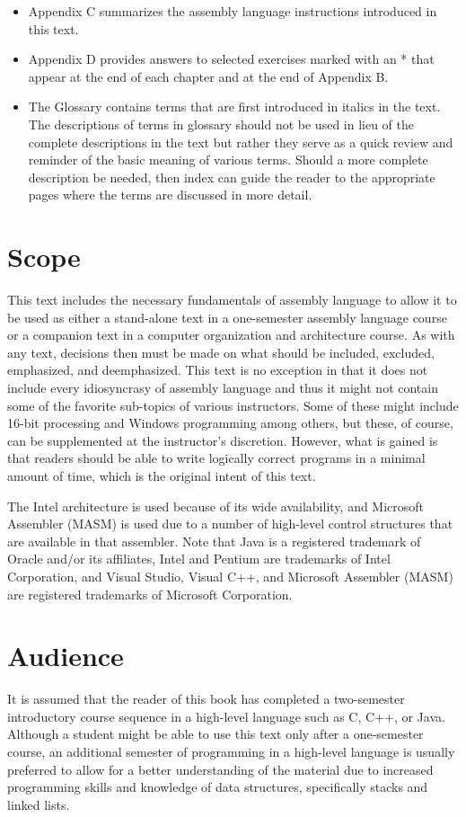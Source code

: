 \documentclass[10pt]{article}
\begin{document}
\begin{itemize}
  \item Appendix C summarizes the assembly language instructions introduced in this text.
  \item Appendix D provides answers to selected exercises marked with an * that appear at the end of each chapter and at the end of Appendix B.
  \item The Glossary contains terms that are first introduced in italics in the text. The descriptions of terms in glossary should not be used in lieu of the complete descriptions in the text but rather they serve as a quick review and reminder of the basic meaning of various terms. Should a more complete description be needed, then index can guide the reader to the appropriate pages where the terms are discussed in more detail.
\end{itemize}

\section*{Scope}
This text includes the necessary fundamentals of assembly language to allow it to be used as either a stand-alone text in a one-semester assembly language course or a companion text in a computer organization and architecture course. As with any text, decisions then must be made on what should be included, excluded, emphasized, and deemphasized. This text is no exception in that it does not include every idiosyncrasy of assembly language and thus it might not contain some of the favorite sub-topics of various instructors. Some of these might include 16-bit processing and Windows programming among others, but these, of course, can be supplemented at the instructor's discretion. However, what is gained is that readers should be able to write logically correct programs in a minimal amount of time, which is the original intent of this text.

The Intel architecture is used because of its wide availability, and Microsoft Assembler (MASM) is used due to a number of high-level control structures that are available in that assembler. Note that Java is a registered trademark of Oracle and/or its affiliates, Intel and Pentium are trademarks of Intel Corporation, and Visual Studio, Visual C++, and Microsoft Assembler (MASM) are registered trademarks of Microsoft Corporation.

\section*{Audience}
It is assumed that the reader of this book has completed a two-semester introductory course sequence in a high-level language such as C, C++, or Java. Although a student might be able to use this text only after a one-semester course, an additional semester of programming in a high-level language is usually preferred to allow for a better understanding of the material due to increased programming skills and knowledge of data structures, specifically stacks and linked lists.
\end{document}
